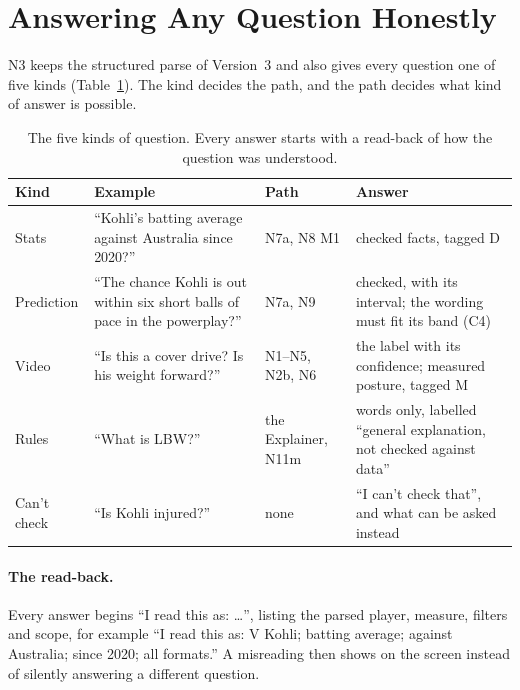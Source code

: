 \documentclass[11pt,a4paper]{article}
\begin{document}
\clearpage
\section{Answering Any Question Honestly}
\label{sec:any}

N3 keeps the structured parse of Version~3 and also gives every question one of
five kinds (Table~\ref{tab:kinds}). The kind decides the path, and the path
decides what kind of answer is possible.

\begin{table}[htbp]
\centering
\footnotesize
\renewcommand{\arraystretch}{1.25}
\begin{tabular}{@{}>{\raggedright\arraybackslash}p{1.8cm}
                  >{\raggedright\arraybackslash}p{4.6cm}
                  >{\raggedright\arraybackslash}p{2.8cm}
                  >{\raggedright\arraybackslash}p{5.6cm}@{}}
\toprule
\textbf{Kind} & \textbf{Example} & \textbf{Path} & \textbf{Answer} \\
\midrule
Stats & ``Kohli's batting average against Australia since 2020?'' & N7a, N8 M1 & checked facts, tagged D \\
Prediction & ``The chance Kohli is out within six short balls of pace in the powerplay?'' & N7a, N9 & checked, with its interval; the wording must fit its band (C4) \\
Video & ``Is this a cover drive? Is his weight forward?'' & N1--N5, N2b, N6 & the label with its confidence; measured posture, tagged M \\
Rules & ``What is LBW?'' & the Explainer, N11m & words only, labelled ``general explanation, not checked against data'' \\
Can't check & ``Is Kohli injured?'' & none & ``I can't check that'', and what can be asked instead \\
\bottomrule
\end{tabular}
\caption{The five kinds of question. Every answer starts with a
read-back of how the question was understood.}
\label{tab:kinds}
\end{table}

\paragraph{The read-back.} Every answer begins ``I read this as: \ldots'', listing
the parsed player, measure, filters and scope, for example ``I read this as:
V Kohli; batting average; against Australia; since 2020; all formats.'' A
misreading then shows on the screen instead of silently answering a different
question.
\end{document}
